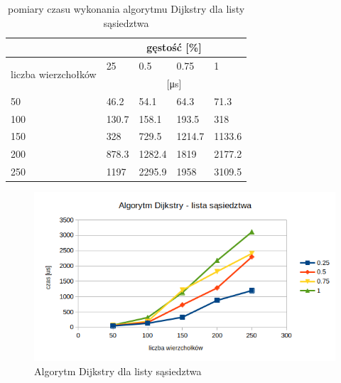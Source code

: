 \documentclass[11pt]{article}
\begin{document}
\begin{table}[H]
    \centering
    \begin{tabular}{|l|llll|}
        \hline
                                             & \multicolumn{4}{c|}{gęstość {[}\%{]}}                                                                      \\ \hline
        \multirow{2}{*}{liczba wierzchołków} & \multicolumn{1}{l|}{25}               & \multicolumn{1}{l|}{0.5}    & \multicolumn{1}{l|}{0.75}   & 1      \\ \cline{2-5}
                                             & \multicolumn{4}{c|}{[μs]}                                                                                  \\ \hline
        50                                   & \multicolumn{1}{l|}{46.2}             & \multicolumn{1}{l|}{54.1}   & \multicolumn{1}{l|}{64.3}   & 71.3   \\ \hline
        100                                  & \multicolumn{1}{l|}{130.7}            & \multicolumn{1}{l|}{158.1}  & \multicolumn{1}{l|}{193.5}  & 318    \\ \hline
        150                                  & \multicolumn{1}{l|}{328}              & \multicolumn{1}{l|}{729.5}  & \multicolumn{1}{l|}{1214.7} & 1133.6 \\ \hline
        200                                  & \multicolumn{1}{l|}{878.3}            & \multicolumn{1}{l|}{1282.4} & \multicolumn{1}{l|}{1819}   & 2177.2 \\ \hline
        250                                  & \multicolumn{1}{l|}{1197}             & \multicolumn{1}{l|}{2295.9} & \multicolumn{1}{l|}{1958}   & 3109.5 \\ \hline
    \end{tabular}
    \caption{pomiary czasu wykonania algorytmu Dijkstry dla listy sąsiedztwa}
\end{table}


\begin{figure}[H]
    \includegraphics[width=13cm]{images/dijkstralista.png}
    \caption{ Algorytm Dijkstry dla listy sąsiedztwa}
\end{figure}
\end{document}
